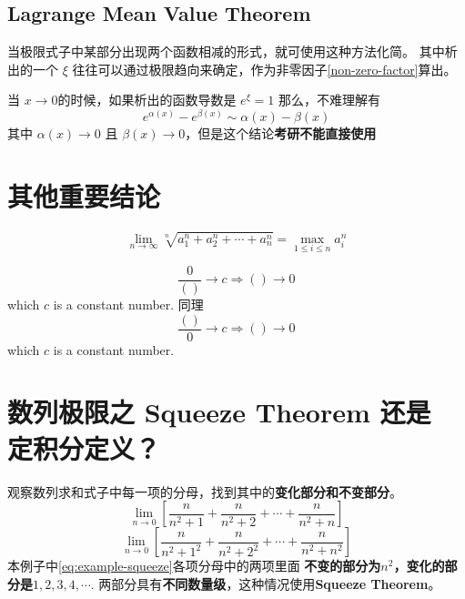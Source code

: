 \subsection{Lagrange Mean Value Theorem} \label{lagrange-limit}
当极限式子中某部分出现两个函数相减的形式，就可使用这种方法化简。
其中析出的一个 $\xi$ 往往可以通过极限趋向来确定，作为非零因子\ref{non-zero-factor}算出。

当 $x\to0$的时候，如果析出的函数导数是 $e^{\xi} = 1$ 那么，不难理解有
\begin{equation}
	e^{\alpha(x)} - e^{\beta(x)} \sim \alpha(x) - \beta(x)
\end{equation}
其中 $\alpha(x) \to 0$ 且 $\beta(x) \to 0$，但是这个结论\textbf{考研不能直接使用}

\section{其他重要结论}
\begin{lemma}
	\begin{equation}
		\lim_{n \to \infty} \sqrt[n]{a^{n}_{1} + a^{n}_{2} + 
			\cdots + a^{n}_{n}} = \max_{1\leq i \leq n}{a_{i}^{n}}
	\end{equation}
\end{lemma}

\begin{lemma}
    \begin{equation}
        \frac{0}{()} \to c \Rightarrow () \to 0
    \end{equation}
    which $c$ is a constant number.
    同理
    \begin{equation}
        \frac{()}{0} \to c \Rightarrow () \to 0
    \end{equation}
    which $c$ is a constant number.

\end{lemma}

\section{数列极限之 Squeeze Theorem 还是 定积分定义？}
\label{use-squeeze-or-definition-of-integral}

观察数列求和式子中每一项的分母，找到其中的\textbf{变化部分和不变部分}。
\begin{equation} \label{eq:example-squeeze}
	\lim_{n \to 0} \left[ 
	\dfrac{n}{n^2+1} + \dfrac{n}{n^2+2} + \cdots + \dfrac{n}{n^2+n} 
	\right]  
\end{equation}
\begin{equation} \label{eq:example-defination-int}
	\lim_{n \to 0} \left[ 
	\dfrac{n}{n^2+1^2} + \dfrac{n}{n^2+2^2} + \cdots + \dfrac{n}{n^2+n^2} 
	\right]  
\end{equation}
本例子中\ref{eq:example-squeeze}各项分母中的两项里面
\textbf{不变的部分为$n^2$，变化的部分是$1,2,3,4,\cdots$}.
两部分具有\textbf{不同数量级}，这种情况使用\textbf{Squeeze Theorem}。

